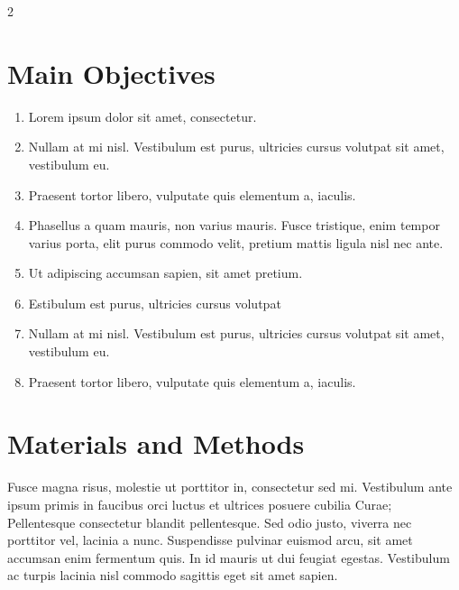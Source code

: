 \documentclass[a0,portrait]{a0poster}
\begin{document}
\begin{multicols}{2}

\color{DarkSlateGray} %

\section*{Main Objectives}

\begin{enumerate}
\item Lorem ipsum dolor sit amet, consectetur.
\item Nullam at mi nisl. Vestibulum est purus, ultricies cursus volutpat sit amet, vestibulum eu.
\item Praesent tortor libero, vulputate quis elementum a, iaculis.
\item Phasellus a quam mauris, non varius mauris. Fusce tristique, enim tempor varius porta, elit purus commodo velit, pretium mattis ligula nisl nec ante.
\item Ut adipiscing accumsan sapien, sit amet pretium.
\item Estibulum est purus, ultricies cursus volutpat
\item Nullam at mi nisl. Vestibulum est purus, ultricies cursus volutpat sit amet, vestibulum eu.
\item Praesent tortor libero, vulputate quis elementum a, iaculis.
\end{enumerate}


\section*{Materials and Methods}

Fusce magna risus, molestie ut porttitor in, consectetur sed mi. Vestibulum ante ipsum primis in faucibus orci luctus et ultrices posuere cubilia Curae; Pellentesque consectetur blandit pellentesque. Sed odio justo, viverra nec porttitor vel, lacinia a nunc. Suspendisse pulvinar euismod arcu, sit amet accumsan enim fermentum quis. In id mauris ut dui feugiat egestas. Vestibulum ac turpis lacinia nisl commodo sagittis eget sit amet sapien.


\end{multicols}
\end{document}
